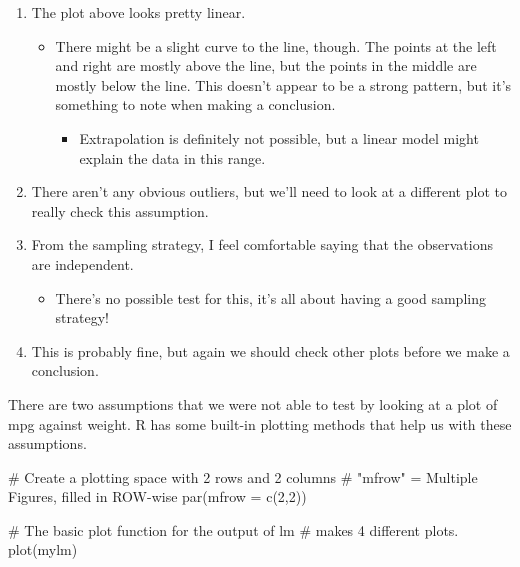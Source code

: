 \documentclass[
  letterpaper,
  DIV=11,
  numbers=noendperiod]{scrreprt}
\newenvironment{Shaded}{\begin{snugshade}}{\end{snugshade}}
\newcommand{\AttributeTok}[1]{\textcolor[rgb]{0.40,0.45,0.13}{#1}}
\newcommand{\CommentTok}[1]{\textcolor[rgb]{0.37,0.37,0.37}{#1}}
\newcommand{\DecValTok}[1]{\textcolor[rgb]{0.68,0.00,0.00}{#1}}
\newcommand{\FunctionTok}[1]{\textcolor[rgb]{0.28,0.35,0.67}{#1}}
\newcommand{\NormalTok}[1]{\textcolor[rgb]{0.00,0.23,0.31}{#1}}
\providecommand{\tightlist}{%
  \setlength{\itemsep}{0pt}\setlength{\parskip}{0pt}}\usepackage{longtable,booktabs,array}
\begin{document}
\begin{enumerate}
\def\labelenumi{\arabic{enumi}.}
\tightlist
\item
  The plot above looks pretty linear.

  \begin{itemize}
  \tightlist
  \item
    There might be a slight curve to the line, though. The points at the
    left and right are mostly above the line, but the points in the
    middle are mostly below the line. This doesn't appear to be a strong
    pattern, but it's something to note when making a conclusion.

    \begin{itemize}
    \tightlist
    \item
      Extrapolation is definitely not possible, but a linear model might
      explain the data in this range.
    \end{itemize}
  \end{itemize}
\item
  There aren't any obvious outliers, but we'll need to look at a
  different plot to really check this assumption.
\item
  From the sampling strategy, I feel comfortable saying that the
  observations are independent.

  \begin{itemize}
  \tightlist
  \item
    There's no possible test for this, it's all about having a good
    sampling strategy!
  \end{itemize}
\item
  This is probably fine, but again we should check other plots before we
  make a conclusion.
\end{enumerate}

There are two assumptions that we were not able to test by looking at a
plot of mpg against weight. R has some built-in plotting methods that
help us with these assumptions.

\begin{Shaded}
\begin{Highlighting}[]
\CommentTok{\# Create a plotting space with 2 rows and 2 columns}
\CommentTok{\# "mfrow" = Multiple Figures, filled in ROW{-}wise}
\FunctionTok{par}\NormalTok{(}\AttributeTok{mfrow =} \FunctionTok{c}\NormalTok{(}\DecValTok{2}\NormalTok{,}\DecValTok{2}\NormalTok{))}

\CommentTok{\# The basic plot function for the output of lm}
\CommentTok{\# makes 4 different plots.}
\FunctionTok{plot}\NormalTok{(mylm)}
\end{Highlighting}
\end{Shaded}
\end{document}
